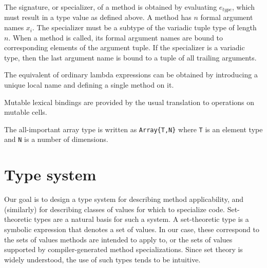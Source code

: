 The signature, or specializer, of a method is obtained by evaluating $e_{type}$,
which must result in a type value as defined above. A method has $n$
formal argument names $x_i$. The specializer must be a subtype of the
variadic tuple type of length $n$. When a method is called, its formal argument
names are bound to corresponding elements of the argument tuple. If the
specializer is a variadic type, then the last argument name is bound to a
tuple of all trailing arguments.


The equivalent of ordinary lambda expressions can be obtained by introducing
a unique local name and defining a single method on it.

Mutable lexical bindings are provided by the usual translation to operations
on mutable cells.

The all-important array type is written as \texttt{Array\{T,N\}} where
\texttt{T} is an element type and \texttt{N} is a number of dimensions.





\section{Type system}

Our goal is to design a type system for describing method applicability,
and (similarly) for describing classes of values for which to specialize code.
Set-theoretic types are a natural basis for such a system.
A set-theoretic type is a symbolic expression that denotes a set of values.
In our case, these correspond to the sets of values methods are intended to apply
to, or the sets of values supported by compiler-generated method specializations.
Since set theory is widely understood, the use of such types tends to be intuitive.

